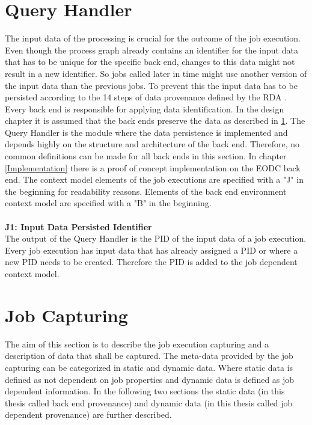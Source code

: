 \documentclass[draft,final]{vutinfth} %
\begin{document}
\section{Query Handler}\label{Design:Data Identification}
The input data of the processing is crucial for the outcome of the job execution. Even though the process graph already contains an identifier for the input data that has to be unique for the specific back end, changes to this data might not result in a new identifier. So jobs called later in time might use another version of the input data than the previous jobs. To prevent this the input data has to be persisted according to the 14 steps of data provenance defined by the RDA \cite{rauber2016identification}. Every back end is responsible for applying data identification. In the design chapter it is assumed that the back ends preserve the data as described in \ref{Design:Data Identification}. The Query Handler is the module where the data persistence is implemented and depends highly on the structure and architecture of the back end. Therefore, no common definitions can be made for all back ends in this section. In chapter \ref{Implementation} there is a proof of concept implementation on the EODC back end. The context model elements of the job executions are specified with a "J" in the beginning for readability reasons. Elements of the back end environment context model are specified with a "B" in the beginning. \\
\\
\textbf{J1: Input Data Persisted Identifier} \\
The output of the Query Handler is the PID of the input data of a job execution. Every job execution has input data that has already assigned a PID or where a new PID needs to be created. Therefore the PID is added to the job dependent context model. 

\section{Job Capturing}\label{Design:Job Capturing}
The aim of this section is to describe the job execution capturing and a description of data that shall be captured. The meta-data provided by the job capturing can be categorized in static and dynamic data. Where static data is defined as not dependent on job properties and dynamic data is defined as job dependent information. In the following two sections the static data (in this thesis called back end provenance) and dynamic data (in this thesis called job dependent provenance) are further described.     
\end{document}
